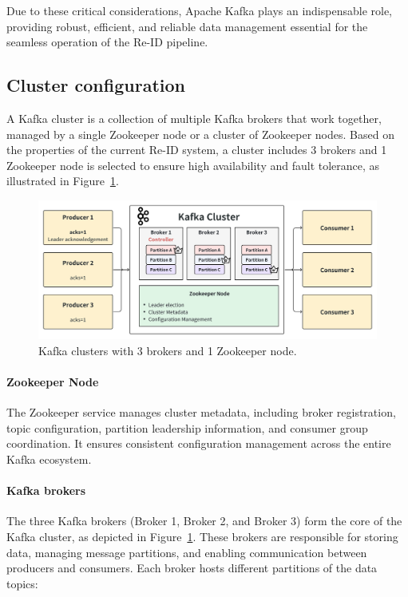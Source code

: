 Due to these critical considerations, Apache Kafka plays an indispensable role, providing robust, efficient, and reliable data management essential for the seamless operation of the Re-ID pipeline.

\subsection{Cluster configuration}

A Kafka cluster is a collection of multiple Kafka brokers that work together, managed by a single Zookeeper node or a cluster of Zookeeper nodes. Based on the properties of the current Re-ID system, a cluster includes 3 brokers and 1 Zookeeper node is selected to ensure high availability and fault tolerance, as illustrated in Figure~\ref{fig:kafka_cluster}.

\begin{figure}[htbp]
    \centering
    \includegraphics[width=1\textwidth]{Figure/kafka_overview.png}
    \caption{Kafka clusters with 3 brokers and 1 Zookeeper node.}
    \label{fig:kafka_cluster}
\end{figure}

\paragraph{Zookeeper Node}

The Zookeeper service manages cluster metadata, including broker registration, topic configuration, partition leadership information, and consumer group coordination. It ensures consistent configuration management across the entire Kafka ecosystem.

\paragraph{Kafka brokers}

The three Kafka brokers (Broker 1, Broker 2, and Broker 3) form the core of the Kafka cluster, as depicted in Figure~\ref{fig:kafka_cluster}. These brokers are responsible for storing data, managing message partitions, and enabling communication between producers and consumers. Each broker hosts different partitions of the data topics:

